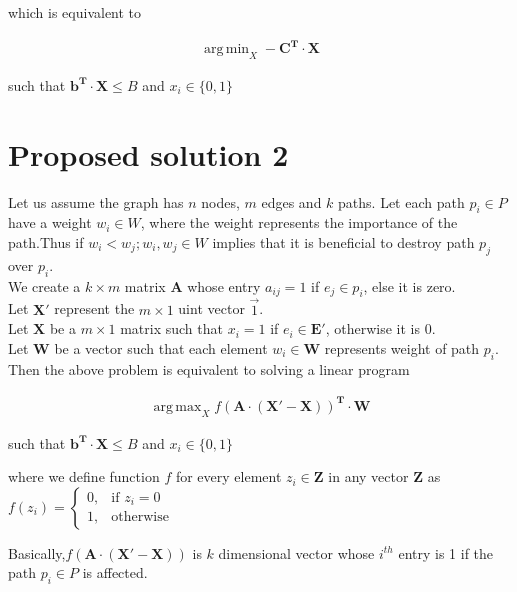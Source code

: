 \documentclass[10pt]{article}
\DeclareMathOperator*{\argmax}{arg\,max}
\DeclareMathOperator*{\argmin}{arg\,min}
\begin{document}
which is equivalent to 

\begin{align}
	\argmin_X -\mathbf{C^T\cdot X}
\end{align}
\begin{center}such that $\mathbf{b^T\cdot X} \leq B$ and $x_i \in \{0,1\}$\end{center}

\newpage

\section*{Proposed solution 2}

Let us assume the graph has $n$ nodes, $m$ edges and $k$ paths. Let each path $p_i \in P$ have a weight $w_i \in W$, where the weight represents the importance of the path.Thus if $w_i < w_j; w_i,w_j \in W$ implies that it is beneficial to destroy path $p_j$ over $p_i$.\\

We create a $k \times m$ matrix $\mathbf{A}$ whose entry $a_{ij}=1$ if $e_j \in p_i$, else it is zero.\\

Let $\mathbf{X'}$ represent the $m \times 1$ uint vector $\vec{1}$.\\

Let $\mathbf{X}$ be a $m \times 1$ matrix such that $x_i=1$  if $e_i \in \mathbf{E'}$, otherwise it is 0.\\

Let $\mathbf{W}$ be a vector such that each element $w_i\in \mathbf{W}$ represents weight of path $p_i$.\\

Then the above problem is equivalent to solving a linear program

\begin{align}
	\argmax_X f\mathbf{\left(A\cdot \left(X'-X\right)\right)^{T}\cdot W}
\end{align}
\begin{center}such that $\mathbf{b^T\cdot X} \leq B$ and $x_i \in \{0,1\}$\end{center}

where we define function $f$ for every element $z_i \in \mathbf{Z}$ in any vector $\mathbf{Z}$ as
		$
		f(z_i)=
		\begin{cases}
    		0,& \text{if } z_i =0\\
    		 1,              & \text{otherwise}
		\end{cases}
		$

Basically,$f\mathbf{\left(A\cdot \left(X'-X\right)\right)}$ is $k$ dimensional vector whose $i^{th}$ entry is 1 if the path $p_i \in P$ is affected.
\end{document}

